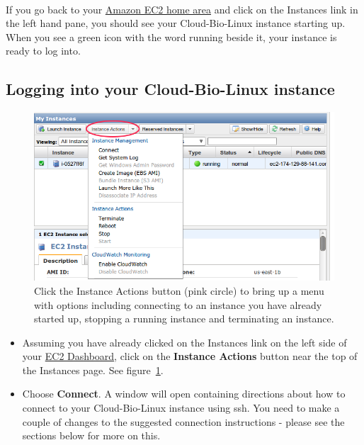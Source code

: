 \paragraph{}If you go back to your \href{http://console.aws.amazon.com/ec2/home}{Amazon EC2 home area} and click on the Instances link in the left hand pane, you should see your Cloud-Bio-Linux instance starting up. When you see a green icon with the word running beside it, your instance is ready to log into.

\subsection{Logging into your Cloud-Bio-Linux instance}


\begin{figure}[!hd]
	\fbox
	{
		\begin{minipage}{13cm}
\includegraphics[width=\maxwidth]{"images/instancesOptions"}
\caption[Start an Instance]{\label{fig:instancesOptions}Click the Instance Actions button (pink circle) to bring up a menu with options including connecting to an instance you have already started up, stopping a running instance and terminating an instance.}
		\end{minipage}
	}
\end{figure}


\begin{itemize}
\item Assuming you have already clicked on the Instances link on the left side of your \href{https://console.aws.amazon.com/ec2/home}{EC2 Dashboard}, click on the \textbf{Instance Actions} button near the top of the Instances page. See figure~\ref{fig:instancesOptions}.
\item Choose \textbf{Connect}. A window will open containing directions about how to connect to your Cloud-Bio-Linux instance using ssh. You need to make a couple of changes to the suggested connection instructions - please see the sections below for more on this.
\end{itemize}


